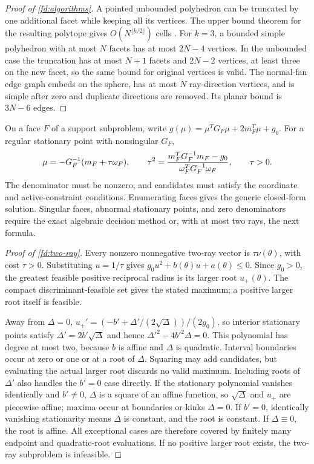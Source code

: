 \begin{proof}[Proof of \cref{fd:algorithms}]
A pointed unbounded polyhedron can be truncated by one additional
facet while keeping all its vertices. The upper bound theorem for
the resulting polytope gives $O(N^{\lfloor k/2\rfloor})$ cells
\citep{McMullen1970}.
For $k=3$, a bounded simple polyhedron with at most $N$ facets has at
most $2N-4$ vertices. In the unbounded case the truncation has at most
$N+1$ facets and $2N-2$ vertices, at least three on the new facet,
so the same bound for original vertices is valid. The normal-fan
edge graph embeds on the sphere, has at most $N$ ray-direction
vertices, and is simple after zero and duplicate directions are
removed. Its planar bound is $3N-6$ edges.
\end{proof}

\begin{remark}\label{fd:generic-kkt}
On a face $F$ of a support subproblem, write
$g(\mu)=\mu^TG_F\mu+2m_F^T\mu+g_0$.
For a regular stationary point with nonsingular $G_F$,
\[
 \mu=-G_F^{-1}(m_F+\tau\omega_F),\qquad
 \tau^2=\frac{m_F^TG_F^{-1}m_F-g_0}
                  {\omega_F^TG_F^{-1}\omega_F},\qquad \tau>0.
\]
The denominator must be nonzero, and candidates must satisfy the
coordinate and active-constraint conditions. Enumerating faces gives
the generic closed-form solution. Singular faces, abnormal stationary
points, and zero denominators require the exact algebraic decision
method or, with at most two rays, the next formula.
\end{remark}

\begin{proof}[Proof of \cref{fd:two-ray}]
\label{fd:two-ray-proof}
Every nonzero nonnegative two-ray vector is $\tau\nu(\theta)$, with
cost $\tau>0$. Substituting $u=1/\tau$ gives
$g_0u^2+b(\theta)u+a(\theta)\le0$. Since $g_0>0$, the greatest feasible
positive reciprocal radius is its larger root $u_+(\theta)$.
The compact discriminant-feasible set gives the stated maximum;
a positive larger root itself is feasible.

Away from $\Delta=0$,
$u_+'=(-b'+\Delta'/(2\sqrt\Delta))/(2g_0)$, so interior stationary points
satisfy $\Delta'=2b'\sqrt\Delta$ and hence
$\Delta'^2-4b'^2\Delta=0$. This polynomial has degree at most two, because
$b$ is affine and $\Delta$ is quadratic. Interval boundaries occur at
zero or one or at a root of $\Delta$. Squaring may add candidates, but
evaluating the actual larger root discards no valid maximum.
Including roots of $\Delta'$ also handles the $b'=0$ case directly.
If the stationary polynomial vanishes identically and $b'\ne0$,
$\Delta$ is a square of an affine function, so $\sqrt\Delta$ and $u_+$ are
piecewise affine; maxima occur at boundaries or kinks $\Delta=0$.
If $b'=0$, identically vanishing stationarity means $\Delta$ is constant,
and the root is constant. If $\Delta\equiv0$, the root is affine.
All exceptional cases are therefore covered by finitely many
endpoint and quadratic-root evaluations. If no positive larger root
exists, the two-ray subproblem is infeasible.
\end{proof}

